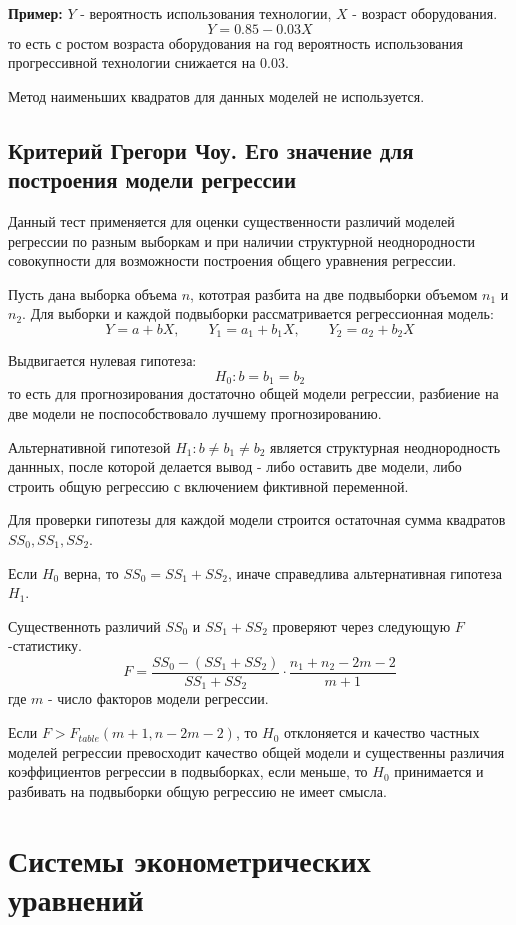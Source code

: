 \documentclass[aps,%
12pt,%
final,%
oneside,
onecolumn,%
musixtex, %
superscriptaddress,%
centertags]{article} %
\theoremstyle{plain}
\theoremstyle{definition}
\theoremstyle{remark}
\begin{document}
\textbf{Пример:} $Y$ - вероятность использования технологии, $X$ - возраст оборудования.
$$Y = 0.85 - 0.03X$$
то есть с ростом возраста оборудования на год вероятность использования прогрессивной технологии снижается на $0.03$.

Метод наименьших квадратов для данных моделей не используется.


\newpage
\subsection{Критерий Грегори Чоу. Его значение для построения модели регрессии}

Данный тест применяется для оценки существенности различий моделей регрессии по разным выборкам и при наличии структурной неоднородности совокупности для возможности построения общего уравнения регрессии.

Пусть дана выборка объема $n$, кототрая разбита на две подвыборки объемом $n_1$ и $n_2$. Для выборки и каждой подвыборки рассматривается регрессионная модель:
$$Y = a + bX, \qquad Y_1 = a_1 + b_1X, \qquad Y_2 = a_2 + b_2X$$ 

Выдвигается нулевая гипотеза:
$$H_0: b = b_1 = b_2$$
то есть для прогнозирования достаточно общей модели регрессии, разбиение на две модели не поспособствовало лучшему прогнозированию.

Альтернативной гипотезой $H_1: b \neq b_1 \neq b_2$ является структурная неоднородность даннных, после которой делается вывод - либо оставить две модели, либо строить общую регрессию с включением фиктивной переменной.

Для проверки гипотезы для каждой модели строится остаточная сумма квадратов $SS_0, SS_1,SS_2$.

Если $H_0$ верна, то $SS_0 = SS_1 + SS_2$, иначе справедлива альтернативная гипотеза $H_1$.

Существенноть различий $SS_0$ и $SS_1 + SS_2$ проверяют через следующую $F$-статистику.
$$F  = \frac{SS_0 - (SS_1 + SS_2)}{SS_1 + SS_2} \cdot \frac{n_1+n_2-2m-2}{m+1}$$
где $m$ - число факторов модели регрессии.

Если $F > F_{table} (m+1, n-2m-2)$, то $H_0$ отклоняется и качество частных моделей регрессии превосходит качество общей модели и существенны различия коэффициентов регрессии в подвыборках, если меньше, то $H_0$ принимается и разбивать на подвыборки общую регрессию не имеет смысла.
\newpage

\section{Системы эконометрических уравнений}
\end{document}
